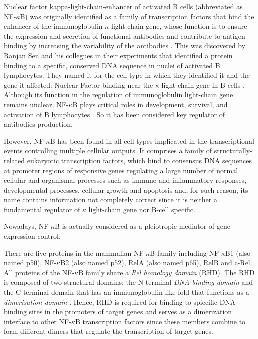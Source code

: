 \documentclass[12pt,a4paper]{report}
\begin{document}
Nuclear factor kappa-light-chain-enhancer of activated B cells (abbreviated as NF-$\kappa$B) was originally identified as a family of transcription factors that bind the enhancer of the immunoglobulin $\kappa$ light-chain gene, whose function is to ensure the expression and secretion of functional antibodies and contribute to antigen binding by increasing the variability of the antibodies \cite{immunoglobulin}. This was discovered by Ranjan Sen and his collegues in their experiments that identified a protein binding to a specific, conserved DNA sequence in nuclei of activated B lymphocytes. They named it for the cell type in which they identified it and the gene it affected: Nuclear Factor binding near the $\kappa$ light chain gene in B cells \cite{nfkb30years}. Although its function in the regulation of immunoglobulin light-chain gene remains unclear, NF-$\kappa$B plays critical roles in development, survival, and activation of B lymphocytes \cite{Immuno}. So it has been considered key regulator of antibodies production. 

However, NF-$\kappa$B has been found in all cell types implicated in the transcriptional events controlling multiple cellular outputs. It comprises a family of structurally-related eukaryotic transcription factors, which bind to consensus DNA sequences at promoter regions of responsive genes regulating a large number of normal cellular and organismal processes such as immune and inflammatory responses, developmental processes, cellular growth and apoptosis and, for such reason, its name contains information not completely correct since it is neither a fundamental regulator of $\kappa$ light-chain gene nor B-cell specific.

Nowadays, NF-$\kappa$B is actually considered as a pleiotropic mediator of gene expression control. 


There are five proteins in the mammalian NF-$\kappa$B family including NF-$\kappa$B1 (also named p50), NF-$\kappa$B2 (also named p52), RelA (also named p65), RelB and c-Rel. All proteins of the NF-$\kappa$B family share a \emph{Rel homology domain} (RHD). The RHD is composed of two structural domains: the N-terminal \emph{DNA binding domain} and the C-terminal domain that has an immunoglobulin-like fold that functions as a \emph{dimerisation domain} \cite{domain}. Hence, RHD is required for binding to spiecific DNA binding sites in the promoters of target genes and serves as a dimerization interface to other NF-$\kappa$B transcription factors since these members combine to form different dimers that regulate the transcription of target genes. %
\end{document}
